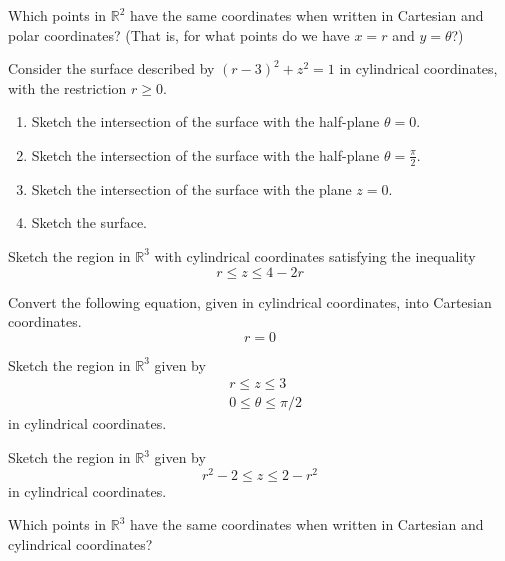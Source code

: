 \documentclass{ximera}
\begin{document}
\begin{problem}
Which points in $\mathbb{R}^2$ have the same coordinates when written in Cartesian and polar coordinates? (That is, for what points do we have $x=r$ and $y=\theta$?)
\end{problem}

\begin{problem}
Consider the surface described by $(r-3)^2 +z^2 = 1$ in cylindrical coordinates, with the restriction $r\geq 0$.
\begin{enumerate}
\item Sketch the intersection of the surface with the half-plane $\theta = 0$.
\item Sketch the intersection of the surface with the half-plane $\theta = \frac{\pi}{2}$.
\item Sketch the intersection of the surface with the plane $z = 0$. 
\item Sketch the surface.
\end{enumerate}
\end{problem}

\begin{problem}
Sketch the region in $\mathbb{R}^3$ with cylindrical coordinates satisfying the inequality
\[
r\leq z \leq 4-2r
\]
\end{problem}

\begin{problem}
Convert the following equation, given in cylindrical coordinates, into Cartesian coordinates.
\[
r = 0
\]
\end{problem}

\begin{problem}
Sketch the region in $\mathbb{R}^3$ given by
\begin{align*}
&r\leq z\leq 3\\
&0\leq\theta \leq\pi/2
\end{align*}
in cylindrical coordinates.
\end{problem}

\begin{problem}
Sketch the region in $\mathbb{R}^3$ given by
\[
r^2-2\leq z\leq 2-r^2
\]
in cylindrical coordinates.

\end{problem}

\begin{problem}
Which points in $\mathbb{R}^3$ have the same coordinates when written in Cartesian and cylindrical coordinates?
\end{problem}
\end{document}
